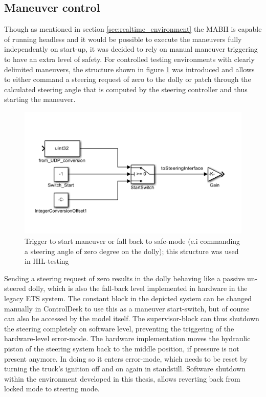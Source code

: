 \documentclass[ExampleMasters.tex]{subfiles}
\begin{document}
\subsection{Maneuver control}
Though as mentioned in section \ref{sec:realtime_environment} the \gls{MABII} is capable of running headless and it would be possible to execute the maneuvers fully independently on start-up, it was decided to rely on manual maneuver triggering to have an extra level of safety. For controlled testing environments with clearly delimited maneuvers, the structure shown in figure \ref{fig:controlDesk_trigger} was introduced and allows to either command a steering request of zero to the dolly or patch through the calculated steering angle that is computed by the steering controller and thus starting the maneuver. 

\begin{figure}[!htb]
	\centering
	\includegraphics[width=0.6\linewidth]{figures/controlDesk_trigger}
	\caption[Trigger to start maneuver or fall back to safe-mode (e.i commanding a steering angle of zero degree on the dolly); this structure was used in \acrshort{HIL}-testing]{Trigger to start maneuver or fall back to safe-mode (e.i commanding a steering angle of zero degree on the dolly); this structure was used in \gls{HIL}-testing}
	\label{fig:controlDesk_trigger}
\end{figure}

Sending a steering request of zero results in the dolly behaving like a passive un-steered dolly, which is also the fall-back level implemented in hardware in the legacy \gls{ETS} system. The constant block in the depicted system can be changed manually in ControlDesk to use this as a maneuver start-switch, but of course can also be accessed by the model itself. The supervisor-block can thus shutdown the steering completely on software level, preventing the triggering of the hardware-level error-mode. The hardware implementation moves the hydraulic piston of the steering system back to the middle position, if pressure is not present anymore. In doing so it enters error-mode, which needs to be reset by turning the truck's ignition off and on again in standstill. Software shutdown within the environment developed in this thesis, allows reverting back from locked mode to steering mode. 
\end{document}
